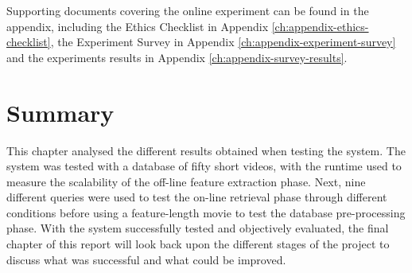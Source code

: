 Supporting documents covering the online experiment can be found in the appendix, including the Ethics Checklist in Appendix \ref{ch:appendix-ethics-checklist}, the Experiment Survey in Appendix \ref{ch:appendix-experiment-survey} and the experiments results in Appendix \ref{ch:appendix-survey-results}.


\section{Summary}

This chapter analysed the different results obtained when testing the system. The system was tested with a database of fifty short videos, with the runtime used to measure the scalability of the off-line feature extraction phase. Next, nine different queries were used to test the on-line retrieval phase through different conditions before using a feature-length movie to test the database pre-processing phase. With the system successfully tested and objectively evaluated, the final chapter of this report will look back upon the different stages of the project to discuss what was successful and what could be improved.